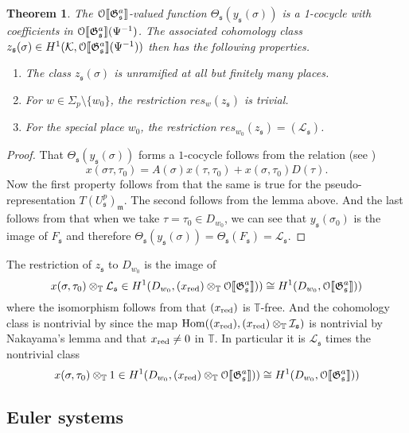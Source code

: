 \documentclass[leqno]{amsart}
\newtheorem{thm}{Theorem}[section]
\theoremstyle{definition}
\theoremstyle{remark}
\newcommand{\eo}{\EuScript{O}}
\DeclareMathOperator{\Hom}{Hom}
\newcommand{\fm}{\mathfrak{m}}
\newcommand{\fs}{\mathfrak{s}}
\newcommand{\xx}{x_\textnormal{red}}
\newcommand{\K}{{\mathcal{K}}} %
\newcommand{\fG}{\mathfrak{G}}
\newcommand{\TT}{\mathbb{T}} %
\newcommand{\I}{\mathcal{I}} %
\begin{document}
\begin{thm}\label{thm:eu1}
The $\eo\llbracket \fG_\fs^a\rrbracket$-valued function
$\Theta_\fs(y_\fs(\sigma))$
is a 1-cocycle with coefficients in 
$\eo\llbracket \fG_\fs^a\rrbracket(\Psi^{-1})$.
The associated cohomology class
$z_\fs(\sigma)\in H^1(\K, \eo\llbracket \fG_\fs^a\rrbracket(\Psi^{-1}))$
then has the following properties.
\begin{enumerate}
    \item The class $z_\fs(\sigma)$ is unramified 
    at all but finitely many places.
    \item For $w\in \Sigma_p\setminus\{w_0\}$,
    the restriction $res_{w}(z_\fs)$ is trivial.
    \item For the special place $w_0$,
    the restriction $res_{w_0}(z_\fs)=(\mathcal{L}_{\fs})$.
\end{enumerate}
\end{thm}

\begin{proof}
That $\Theta_\fs(y_\fs(\sigma))$ forms a $1$-cocycle
follows from the relation
(see \cite[\S 2.1.4]{pan})
\[
    x(\sigma\tau,\tau_0)=
    A(\sigma)x(\tau,\tau_0)+
    x(\sigma,\tau_0)D(\tau).
\]
Now the first property 
follows from that the same is true 
for the pseudo-representation $T(U^p_\fs)_\fm$.
The second follows from the lemma above.
And the last follows from that
when we take $\tau=\tau_0\in D_{w_0}$,
we can see that $y_\fs(\sigma_0)$
is the image of $F_{\fs}$
and therefore $\Theta_\fs(y_\fs(\sigma))=\Theta_{\fs}(F_\fs)=\mathcal{L}_\fs$.


\end{proof}

The restriction of $z_\fs$
to $D_{w_0}$ is the image of 
\[
    x(\sigma,\tau_0)\otimes_{\TT}\mathcal{L}_\fs
    \in H^1(D_{w_0}, (\xx)\otimes_{\TT}\eo\llbracket\fG_\fs^a\rrbracket))
    \cong
    H^1(D_{w_0}, \eo\llbracket\fG_\fs^a\rrbracket))
\]
where the isomorphism
follows from that $(\xx)$ is $\TT$-free.
And the cohomology class is nontrivial
by \cite[Thm 1.5.5]{BC}
since the map 
$\Hom((\xx), (\xx)\otimes_{\TT}\I_\fs)$
is nontrivial
by Nakayama's lemma and that $\xx\neq 0$ in $\TT$.
In particular it is $\mathcal{L}_\fs$
times the nontrivial class
\[
    x(\sigma,\tau_0)\otimes_{\TT}1
    \in H^1(D_{w_0}, (\xx)\otimes_{\TT}\eo\llbracket\fG_\fs^a\rrbracket))
    \cong
    H^1(D_{w_0}, \eo\llbracket\fG_\fs^a\rrbracket))
\]


\subsection{Euler systems}
\end{document}
